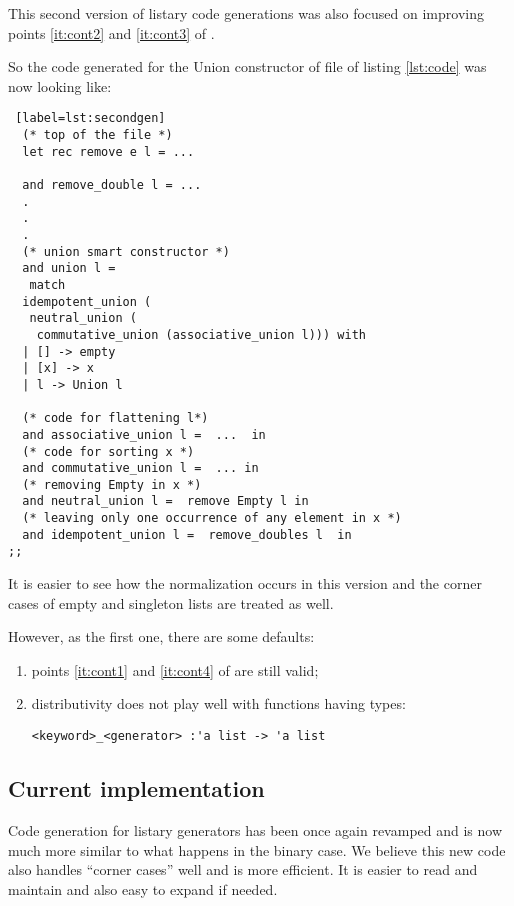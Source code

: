 This second version of listary code generations was also focused on
improving points \ref{it:cont2} and \ref{it:cont3} of
.

So the code generated for the {\sf Union} constructor of \mlm file of
listing \ref{lst:code} was  now looking like:

\begin{lstlisting} [label=lst:secondgen]
  (* top of the file *)
  let rec remove e l = ...

  and remove_double l = ...
  .
  .
  .
  (* union smart constructor *)
  and union l = 
   match
  idempotent_union (
   neutral_union (
    commutative_union (associative_union l))) with
  | [] -> empty 
  | [x] -> x
  | l -> Union l
 
  (* code for flattening l*)
  and associative_union l =  ...  in
  (* code for sorting x *)
  and commutative_union l =  ... in
  (* removing Empty in x *)
  and neutral_union l =  remove Empty l in
  (* leaving only one occurrence of any element in x *)
  and idempotent_union l =  remove_doubles l  in
;;
\end{lstlisting}

It is easier to see how the normalization occurs in this version and
the corner cases of empty and singleton lists are treated as well.

However, as the first one, there are some defaults:
\begin{enumerate}

\item points \ref{it:cont1} and \ref{it:cont4} of
 are still valid;

\item distributivity does not play well with functions having types:
\begin{verbatim}
<keyword>_<generator> :'a list -> 'a list
\end{verbatim}

\end{enumerate}

\subsection{Current implementation}
\label{sec:list_current}
Code generation for listary generators has been once again revamped
and is now much more similar to what happens in the binary case. We
believe this new code also handles ``corner cases'' well and is more
efficient. It is easier to read and maintain and also easy to expand
if needed. 


